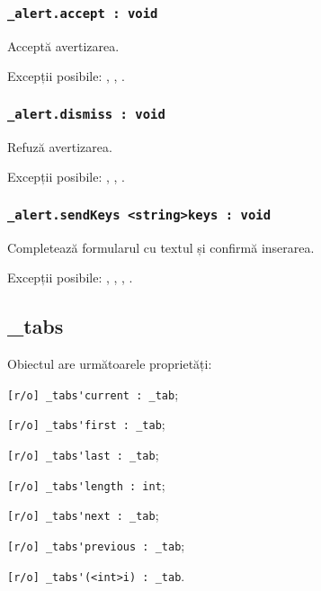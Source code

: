 \subsubsection{\lstinline|_alert.accept : void|}

Acceptă avertizarea.

Excepții posibile: , , .

\subsubsection{\lstinline|_alert.dismiss : void|}

Refuză avertizarea.

Excepții posibile: , , .

\subsubsection{\lstinline|_alert.sendKeys <string>keys : void|}

Completează formularul cu textul  și confirmă inserarea.

Excepții posibile: , , , .

\subsection{{\color{orange} \_tabs}}

Obiectul \tabs{} are următoarele proprietăți:
\begin{icItems}
	\item \lstinline|[r/o] _tabs'current : _tab|;
	\item \lstinline|[r/o] _tabs'first : _tab|;
	\item \lstinline|[r/o] _tabs'last : _tab|;
	\item \lstinline|[r/o] _tabs'length : int|;
	\item \lstinline|[r/o] _tabs'next : _tab|;
	\item \lstinline|[r/o] _tabs'previous : _tab|;
	\item \lstinline|[r/o] _tabs'(<int>i) : _tab|.
\end{icItems}


